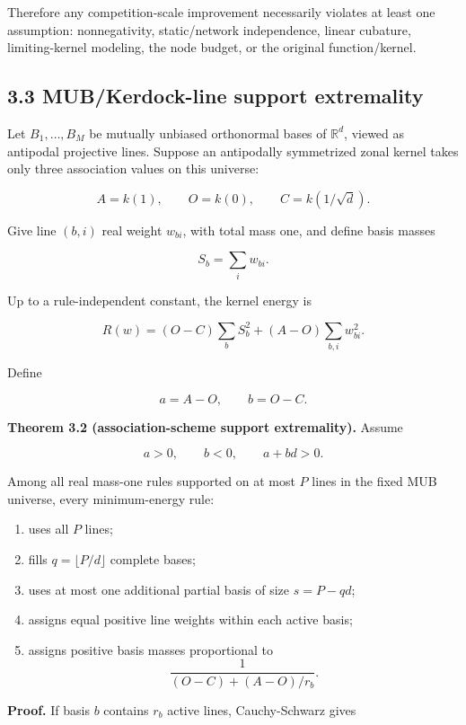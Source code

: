 \documentclass[
  10pt,
]{article}
\providecommand{\tightlist}{%
  \setlength{\itemsep}{0pt}\setlength{\parskip}{0pt}}
\begin{document}
Therefore any competition-scale improvement necessarily violates at
least one assumption: nonnegativity, static/network independence, linear
cubature, limiting-kernel modeling, the node budget, or the original
function/kernel.

\subsection{3.3 MUB/Kerdock-line support
extremality}\label{mubkerdock-line-support-extremality}

Let \(B_1,\ldots,B_M\) be mutually unbiased orthonormal bases of
\(\mathbb R^d\), viewed as antipodal projective lines. Suppose an
antipodally symmetrized zonal kernel takes only three association values
on this universe:

\[
A=k(1),\qquad O=k(0),\qquad C=k(1/\sqrt d).
\]

Give line \((b,i)\) real weight \(w_{bi}\), with total mass one, and
define basis masses

\[
S_b=\sum_i w_{bi}.
\]

Up to a rule-independent constant, the kernel energy is

\[
R(w)= (O-C)\sum_b S_b^2 +(A-O)\sum_{b,i}w_{bi}^2.
\]

Define

\[
a=A-O,
\qquad
b=O-C.
\]

\textbf{Theorem 3.2 (association-scheme support extremality).} Assume

\[
a>0,\qquad b<0,\qquad a+bd>0.
\]

Among all real mass-one rules supported on at most \(P\) lines in the
fixed MUB universe, every minimum-energy rule:

\begin{enumerate}
\def\labelenumi{\arabic{enumi}.}
\tightlist
\item
  uses all \(P\) lines;
\item
  fills \(q=\lfloor P/d\rfloor\) complete bases;
\item
  uses at most one additional partial basis of size \(s=P-qd\);
\item
  assigns equal positive line weights within each active basis;
\item
  assigns positive basis masses proportional to \[
  \frac{1}{(O-C)+(A-O)/r_b}.
  \]
\end{enumerate}

\textbf{Proof.} If basis \(b\) contains \(r_b\) active lines,
Cauchy-Schwarz gives
\end{document}
